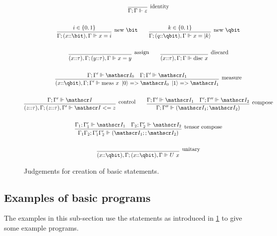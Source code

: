 \begin{figure}[htbp]
\[
\begin{gathered}
\infer[{\raisebox{1ex}{identity}}]
   {\Gamma ; \Gamma \ientail \varepsilon}
   {}\\
\\
\infer[{\raisebox{2ex}{new \bit}}]
   {\Gamma ; (x{::}\bit),\Gamma \ientail x = i}
   {i\in\{0,1\}}\qquad
\infer[{\raisebox{2ex}{new \qbit}}]
   {\Gamma ; (q{::}\qbit),\Gamma \ientail x = \ket{k}}
   {k\in\{0,1\}}\\ 
\\
\infer[{\raisebox{2ex}{assign}}]
   {(x{::}\tau),\Gamma;(y{::}\tau),\Gamma\ientail x = y}
   {}\qquad
\infer[{\raisebox{2ex}{discard}}]
   {(x{::}\tau),\Gamma ; \Gamma\ientail \text{disc }x}
   {}\\ 
\\
\infer[{\raisebox{1ex}{measure}}]
   {(x{::}\qbit),\Gamma; \Gamma'\ientail \text{meas }x\ \ket{0} =>\qins_0\ 
    \ket{1} => \qins_1}
   {\Gamma;\Gamma'\ientail \qins_0 & \Gamma; \Gamma' \ientail \qins_1}\\
\\
\infer[{\raisebox{2ex}{control}}]
   {(z{::}\tau),\Gamma;(z{::}\tau),\Gamma'\ientail \qins <= z}
   {\Gamma; \Gamma' \ientail \qins}\qquad
\infer[{\raisebox{1ex}{compose}}]
   {\Gamma; \Gamma'' \ientail (\qins_1 ; \qins_2)}
   {\Gamma;\Gamma'\ientail \qins_1 & \Gamma'; \Gamma'' \ientail \qins_2}\\
\\
\infer[{\raisebox{2ex}{tensor compose}}]
    {\Gamma_1 \Gamma_2; \Gamma_1' \Gamma_2' \ientail (\qins_1 ;; \qins_2)}
   {\Gamma_1;\Gamma_1'\ientail \qins_1 & \Gamma_2; \Gamma_2' \ientail \qins_2}\\
\\
\infer[{\raisebox{2ex}{unitary}}]
   {(x{::}\qbit),\Gamma;(x{::}\qbit),\Gamma\ientail U\ x}{}
\end{gathered}
\]
\caption[Judgements for statement creation]{Judgements for creation of basic \lqpl{} statements.}\label{fig:judgementscreatestatements}
\end{figure}






\subsection{Examples of basic \protect{\lqpl} programs}
The examples in this sub-section use the statements as introduced
in \ref{fig:judgementscreatestatements} to give some example programs.

